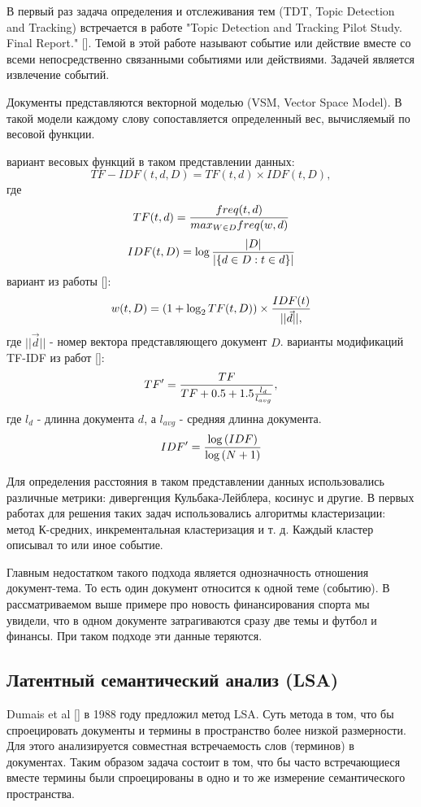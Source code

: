 В первый раз задача определения и отслеживания тем (TDT, Topic Detection and Tracking) встречается в работе 
"Topic Detection and Tracking Pilot Study. Final Report." [\todo{}]. Темой в этой работе называют событие или действие вместе со всеми непосредственно связанными событиями или действиями. Задачей является извлечение событий.

Документы представляются векторной моделью (VSM, Vector Space Model). В такой модели каждому слову сопоставляется определенный вес, вычисляемый по весовой функции.

 вариант весовых функций в таком представлении данных:
$$
TF-IDF(t,d,D)=TF(t,d) \times IDF(t,D),
$$
где
$$
TF(t,d)={{freq(t,d)}\over{max_{W \in D} freq(w,d)}}
$$
$$
IDF(t,D)=\log{{|D|}\over{|\{ d \in D:t \in d \}|}}
$$
 вариант из работы [\todo{}]:
$$
w(t,D)=(1+\log_2{TF(t,D)}) \times {{IDF(t)}\over{||\vec{d}||},}
$$
где $||\vec{d}||$ - номер вектора представляющего документ $D$.
 варианты модификаций TF-IDF из работ [\todo{}]:
$$
TF'={{TF}\over{TF+0.5+1.5{{l_d}\over{l_{avg}}}}},
$$
где $l_d$ - длинна документа $d$, а $l_{avg}$ - средняя длинна документа.
$$
IDF'={{\log{(IDF)}}\over{\log{(N+1)}}}
$$

Для определения расстояния в таком представлении данных использовались различные метрики: дивергенция Кульбака-Лейблера, косинус и другие. В первых работах для решения таких задач использовались алгоритмы кластеризации: метод К-средних, инкрементальная кластеризация и т. д. Каждый кластер описывал то или иное событие.

Главным недостатком такого подхода является однозначность отношения документ-тема. То есть один документ относится к одной теме (событию). В рассматриваемом выше примере про новость финансирования спорта мы увидели, что в одном документе затрагиваются сразу две темы и футбол и финансы. При таком подходе эти данные теряются.

\subsection{Латентный семантический анализ (LSA)}

Dumais et al [\todo{}] в 1988 году предложил метод LSA. Суть метода в том, что бы спроецировать документы и термины в пространство более низкой размерности. Для этого анализируется совместная встречаемость слов (терминов) в документах. Таким образом задача состоит в том, что бы часто встречающиеся вместе термины были спроецированы в одно и то же измерение семантического пространства.

